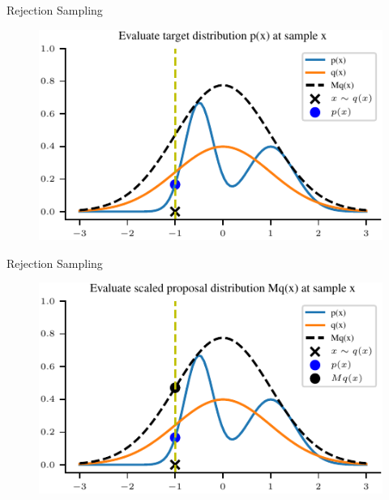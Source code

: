 \documentclass[handout]{beamer}
\begin{document}
    \begin{frame}{Rejection Sampling}
        \begin{figure}
            \centering
            \includegraphics{notebooks/figures/sampling/rejection-sampling--1.0-True-True-True-True-True-False-False-False.pdf}
        \end{figure}
    \end{frame}

    \begin{frame}{Rejection Sampling}
        \begin{figure}
            \centering
            \includegraphics{notebooks/figures/sampling/rejection-sampling--1.0-True-True-True-True-True-True-False-False.pdf}
        \end{figure}
    \end{frame}
\end{document}
